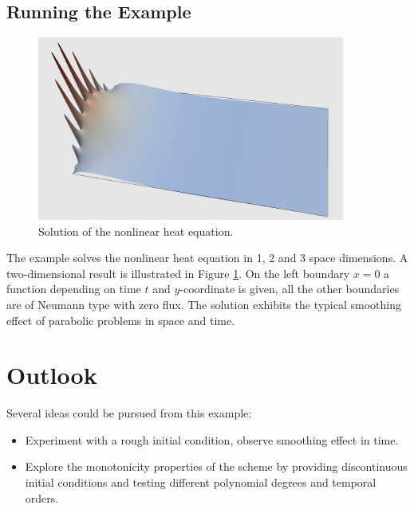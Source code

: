 \documentclass[a4paper,12pt]{article}
\begin{document}
\subsection{Running the Example}

\begin{figure}
\begin{center}
\includegraphics[width=0.9\textwidth]{warp}
\end{center}
\caption{Solution of the nonlinear heat equation.}
\label{fig:Bunt}
\end{figure}

The example solves the nonlinear heat equation in 1, 2 and 3 space dimensions.
A two-dimensional result is illustrated in Figure \ref{fig:Bunt}. On the left boundary
$x=0$ a function depending on time $t$ and $y$-coordinate is given, all the other
boundaries are of Neumann type with zero flux. The solution exhibits the
typical smoothing effect of parabolic problems in space and time.

\section{Outlook}

Several ideas could be pursued from this example:
\begin{itemize}
\item Experiment with a rough initial condition, observe
smoothing effect in time.
\item Explore the monotonicity properties of the scheme by
providing discontinuous initial conditions and testing different
polynomial degrees and temporal orders.
\end{itemize}



\end{document}
